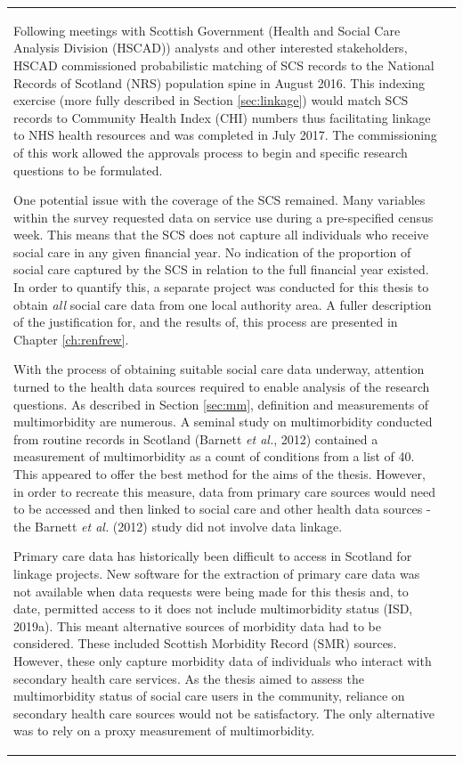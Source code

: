 \documentclass[12pt,a4paper,oneside,table]{report}
\begin{document}
\begin{tabular}[t]{ll}
Following meetings with Scottish Government (Health and Social Care
Analysis Division (HSCAD)) analysts and other interested stakeholders,
HSCAD commissioned probabilistic matching of SCS records to the National
Records of Scotland (NRS) population spine in August 2016. This indexing
exercise (more fully described in Section \ref{sec:linkage}) would match
SCS records to Community Health Index (CHI) numbers thus facilitating
linkage to NHS health resources and was completed in July 2017. The
commissioning of this work allowed the approvals process to begin and
specific research questions to be formulated.

One potential issue with the coverage of the SCS remained. Many
variables within the survey requested data on service use during a
pre-specified census week. This means that the SCS does not capture all
individuals who receive social care in any given financial year. No
indication of the proportion of social care captured by the SCS in
relation to the full financial year existed. In order to quantify this,
a separate project was conducted for this thesis to obtain \emph{all}
social care data from one local authority area. A fuller description of
the justification for, and the results of, this process are presented in
Chapter \ref{ch:renfrew}.

With the process of obtaining suitable social care data underway,
attention turned to the health data sources required to enable analysis
of the research questions. As described in Section \ref{sec:mm},
definition and measurements of multimorbidity are numerous. A seminal
study on multimorbidity conducted from routine records in Scotland
(Barnett \emph{et al.}, 2012) contained a measurement of multimorbidity
as a count of conditions from a list of 40. This appeared to offer the
best method for the aims of the thesis. However, in order to recreate
this measure, data from primary care sources would need to be accessed
and then linked to social care and other health data sources - the
Barnett \textit{et al.} (2012) study did not involve data linkage.

Primary care data has historically been difficult to access in Scotland
for linkage projects. New software for the extraction of primary care
data was not available when data requests were being made for this
thesis and, to date, permitted access to it does not include
multimorbidity status (ISD, 2019a). This meant alternative sources of
morbidity data had to be considered. These included Scottish Morbidity
Record (SMR) sources. However, these only capture morbidity data of
individuals who interact with secondary health care services. As the
thesis aimed to assess the multimorbidity status of social care users in
the community, reliance on secondary health care sources would not be
satisfactory. The only alternative was to rely on a proxy measurement of
multimorbidity.


\end{tabular}
\end{document}

